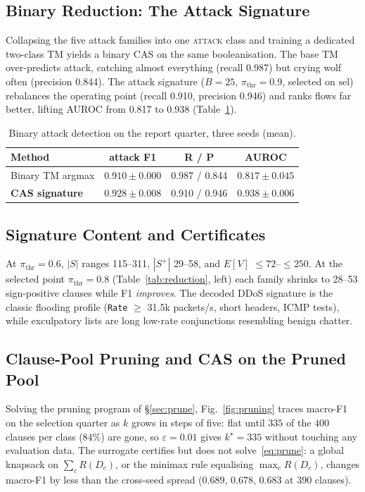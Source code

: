 \documentclass[conference]{IEEEtran}
\begin{document}
\subsection{Binary Reduction: The Attack Signature}
\label{sec:binary}
Collapsing the five attack families into one \textsc{attack} class and
training a dedicated two-class TM yields a binary CAS on the same
booleanisation. The base TM
over-predicts attack, catching almost everything (recall 0.987) but crying
wolf often (precision 0.844). The attack signature ($B{=}25$,
$\pi_{\mathrm{thr}}{=}0.9$, selected on $\mathrm{sel}$) rebalances the
operating point (recall 0.910, precision 0.946) and ranks flows far
better, lifting AUROC from 0.817 to 0.938 (Table~\ref{tab:binary}).

\begin{table}[!htb]
\centering
\caption{Binary attack detection on the report quarter, three seeds
(mean).}
\label{tab:binary}
\footnotesize
\begin{tabular}{@{}lccc@{}}
\toprule
Method & attack F1 & R / P & AUROC \\
\midrule
Binary TM argmax & $0.910 \pm 0.000$ & 0.987 / 0.844 & $0.817 \pm 0.045$ \\
\textbf{CAS signature} & $\mathbf{0.928 \pm 0.008}$ & 0.910 / 0.946 & $\mathbf{0.938 \pm 0.006}$ \\
\bottomrule
\end{tabular}
\end{table}

\subsection{Signature Content and Certificates}
\label{sec:signatures}
At $\pi_{\mathrm{thr}}{=}0.6$, $|S|$ ranges 115--311, $|S^{+}|$ 29--58,
and $E[V]$ ${\le}72$--${\le}250$. At the selected point
$\pi_{\mathrm{thr}}{=}0.8$
(Table~\ref{tab:reduction}, left) each family shrinks to 28--53
sign-positive clauses while F1 \emph{improves}. The decoded DDoS signature
is the classic flooding profile (\texttt{Rate} $\ge$ 31.5k packets/s,
short headers, ICMP tests), while exculpatory lists are long low-rate
conjunctions resembling benign chatter.


\subsection{Clause-Pool Pruning and CAS on the Pruned Pool}
\label{sec:pruned}
Solving the pruning program of \S\ref{sec:prune},
Fig.~\ref{fig:pruning} traces macro-F1 on the selection quarter as $k$
grows in steps of five: flat
until $335$ of the $400$ clauses per class ($84\%$) are gone, so
$\varepsilon = 0.01$ gives $k^{\star} = 335$ without touching any
evaluation data. The surrogate certifies but
does not solve~\eqref{eq:prune}: a global knapsack on $\sum_c R(D_c)$, or
the minimax rule equalising $\max_c R(D_c)$, changes macro-F1 by less than
the cross-seed spread ($0.689$, $0.678$, $0.683$ at $390$ clauses).
\end{document}
